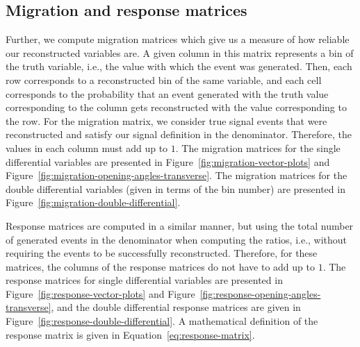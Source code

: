 \documentclass{article}
\begin{document}
\clearpage

\subsection{Migration and response matrices}

Further, we compute migration matrices which give us a measure of how reliable our reconstructed variables are. A given column 
in this matrix represents a bin of the truth variable, i.e., the value with which the event was generated. Then, each 
row corresponds to a reconstructed bin of the same variable, and each cell corresponds to the probability that an event 
generated with the truth value corresponding to the column gets reconstructed with the value corresponding to the row. For the
migration matrix, we consider true signal events that were reconstructed and satisfy our signal definition in the denominator. 
Therefore, the values in each column must add up to $1$. The migration matrices for the single differential variables are presented 
in Figure~\ref{fig:migration-vector-plots} and Figure~\ref{fig:migration-opening-angles-transverse}. The migration matrices 
for the double differential variables (given in terms of the bin number) are presented in Figure~\ref{fig:migration-double-differential}.

Response matrices are computed in a similar manner, but using the total number of generated events in the denominator when 
computing the ratios, i.e., without requiring the events to be successfully reconstructed. Therefore, for these matrices, 
the columns of the response matrices do not have to add up to $1$. The response matrices for single differential variables 
are presented in Figure~\ref{fig:response-vector-plots} and Figure~\ref{fig:response-opening-angles-transverse}, and the double 
differential response matrices are given in Figure~\ref{fig:response-double-differential}.
A mathematical definition of the response matrix is given in Equation~\eqref{eq:response-matrix}.
\end{document}

